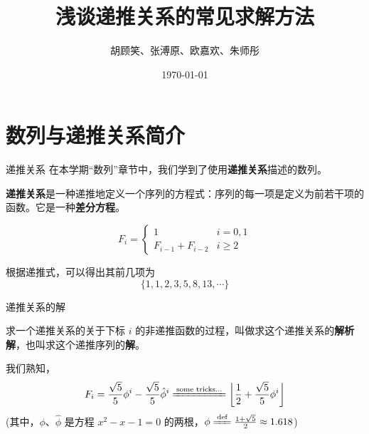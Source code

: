 \documentclass{beamer}
\newcommand{\DocumentTitle}{浅谈递推关系的常见求解方法}
\newcommand{\DocumentAuthor}{胡顾笑、张溥原、欧嘉欢、朱师彤}
\begin{document}
\title{\textbf\DocumentTitle}
\author[国际课程班高一下数学小组展示]{\DocumentAuthor}
\date{\mydate\today}

\maketitle

\section{数列与递推关系简介}

\begin{frame}{递推关系}
    在本学期“数列”章节中，我们学到了使用\textbf{递推关系}描述的数列。
    \begin{definition}
        \textbf{递推关系}是一种递推地定义一个序列的方程式：序列的每一项是定义为前若干项的函数。它是一种\textbf{差分方程}。
    \end{definition}
    \begin{example}
        \begin{displaymath}
            F_i = \begin{cases} 
                1 & i=0,1\\
                F_{i-1} + F_{i-2} & i\geqslant 2
              \end{cases}
        \end{displaymath}

        根据递推式，可以得出其前几项为
        $$
        \{1,1,2,3,5,8,13,\cdots\}
        $$
    \end{example}
\end{frame}

\begin{frame}{递推关系的解}
    \begin{definition}
        求一个递推关系的关于下标 $i$ 的非递推函数的过程，叫做求这个递推关系的\textbf{解析解}，也叫求这个递推序列的\textbf{解}。
    \end{definition}
    \begin{example}
        我们熟知，
        $$
            F_i = \frac{\sqrt 5}{5} \phi^i - \frac{\sqrt 5}{5} {\hat\phi}^i \xlongequal{\text{some tricks...}} \left\lfloor\frac12+\frac{\sqrt 5}{5} \phi^i\right\rfloor
        $$
        (其中，$\phi$、$\hat\phi$ 是方程 $x^2 - x - 1 = 0$ 的两根，$\phi \xlongequal{\text{def}} \frac{1 + \sqrt 5}{2}\approx 1.618$)
    \end{example}
\end{frame}
\end{document}
